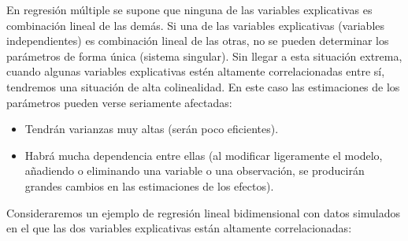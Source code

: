 \documentclass[
  spanish,
]{book}
\theoremstyle{break}
\theoremstyle{definition}
\theoremstyle{definition}
\theoremstyle{definition}
\theoremstyle{remark}
\begin{document}
En regresión múltiple se supone que ninguna de las variables explicativas es combinación lineal de las demás.
Si una de las variables explicativas (variables independientes) es combinación lineal de las otras, no se pueden determinar los parámetros de forma única (sistema singular).
Sin llegar a esta situación extrema, cuando algunas variables explicativas estén altamente correlacionadas entre sí, tendremos una situación de alta colinealidad.
En este caso las estimaciones de los parámetros pueden verse seriamente afectadas:

\begin{itemize}
\item
  Tendrán varianzas muy altas (serán poco eficientes).
\item
  Habrá mucha dependencia entre ellas (al modificar ligeramente el
  modelo, añadiendo o eliminando una variable o una observación,
  se producirán grandes cambios en las estimaciones de los efectos).
\end{itemize}

Consideraremos un ejemplo de regresión lineal bidimensional con datos simulados en el que las dos variables explicativas están altamente correlacionadas:
\end{document}

